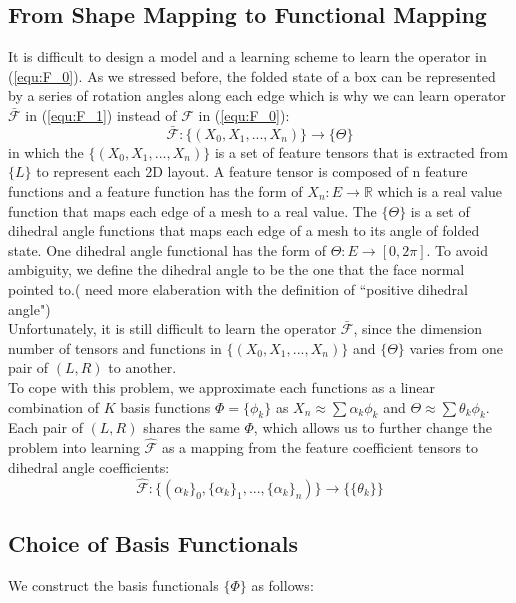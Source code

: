 \subsection{From Shape Mapping to Functional Mapping}
It is difficult to design a model and a learning scheme to learn the operator in (\ref{equ:F_0}). As we stressed before, the folded state of a box can be represented by a series of rotation angles along each edge which is why we can learn operator $\mathcal{\bar{F}}$ in (\ref{equ:F_1}) instead of $\mathcal{F}$ in (\ref{equ:F_0}):
\begin{equation}
\mathcal{\bar{F}}:\{(X_0,X_1,...,X_n)\}\rightarrow\{\Theta\}
\label{equ:F_1}
\end{equation}
in which the $\{(X_0,X_1,...,X_n)\}$ is a set of feature tensors that is extracted from $\{L\}$ to represent each 2D layout. A feature tensor is composed of n feature functions and a feature function has the form of $X_n:E\rightarrow\mathbb{R}$ which is a real value function that maps each edge of a mesh to a real value. The $\{\Theta\}$ is a set of dihedral angle functions that maps each edge of a mesh to its angle of folded state. One dihedral angle functional has the form of $\Theta:E\rightarrow [0,2\pi]$. To avoid ambiguity, we define the dihedral angle to be the one that the face normal pointed to.({\color{red} {need more elaberation with the definition of ``positive dihedral angle"}})\\
Unfortunately, it is still difficult to learn the operator $\mathcal{\bar{F}}$, since the dimension number of tensors and functions in $\{(X_0,X_1,...,X_n)\}$ and $\{\Theta\}$ varies from one pair of $(L,R)$ to another.\\
To cope with this problem, we approximate each functions as a linear combination of $K$ basis functions $\Phi = \{\phi_k\}$ as $X_n \approx \sum \alpha_k \phi_k$  and $\Theta \approx \sum \theta_k \phi_k$. Each pair of $(L,R)$ shares the same $\Phi$, which allows us to further change the problem into learning $\mathcal{\hat{F}}$ as a mapping from the feature coefficient tensors to dihedral angle coefficients:
\begin{equation}
\mathcal{\hat{F}}:\{(\alpha_k\}_0,\{\alpha_k\}_1,...,\{\alpha_k\}_n)\}\rightarrow\{\{\theta_k\}\}
\label{equ:F_2}
\end{equation}
\subsection{Choice of Basis Functionals}
We construct the basis functionals $\{\Phi\}$ as follows:\\
